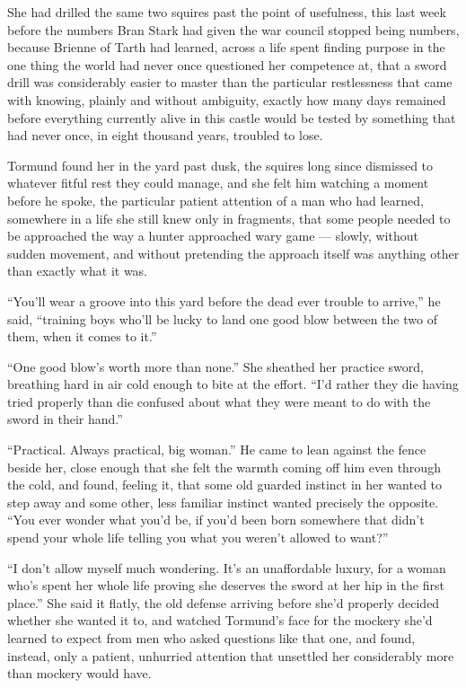 She had drilled the same two squires past the point of usefulness, this last week before the numbers Bran Stark had given the war council stopped being numbers, because Brienne of Tarth had learned, across a life spent finding purpose in the one thing the world had never once questioned her competence at, that a sword drill was considerably easier to master than the particular restlessness that came with knowing, plainly and without ambiguity, exactly how many days remained before everything currently alive in this castle would be tested by something that had never once, in eight thousand years, troubled to lose.

Tormund found her in the yard past dusk, the squires long since dismissed to whatever fitful rest they could manage, and she felt him watching a moment before he spoke, the particular patient attention of a man who had learned, somewhere in a life she still knew only in fragments, that some people needed to be approached the way a hunter approached wary game — slowly, without sudden movement, and without pretending the approach itself was anything other than exactly what it was.

“You’ll wear a groove into this yard before the dead ever trouble to arrive,” he said, “training boys who’ll be lucky to land one good blow between the two of them, when it comes to it.”

“One good blow’s worth more than none.” She sheathed her practice sword, breathing hard in air cold enough to bite at the effort. “I’d rather they die having tried properly than die confused about what they were meant to do with the sword in their hand.”

“Practical. Always practical, big woman.” He came to lean against the fence beside her, close enough that she felt the warmth coming off him even through the cold, and found, feeling it, that some old guarded instinct in her wanted to step away and some other, less familiar instinct wanted precisely the opposite. “You ever wonder what you’d be, if you’d been born somewhere that didn’t spend your whole life telling you what you weren’t allowed to want?”

“I don’t allow myself much wondering. It’s an unaffordable luxury, for a woman who’s spent her whole life proving she deserves the sword at her hip in the first place.” She said it flatly, the old defense arriving before she’d properly decided whether she wanted it to, and watched Tormund’s face for the mockery she’d learned to expect from men who asked questions like that one, and found, instead, only a patient, unhurried attention that unsettled her considerably more than mockery would have.

